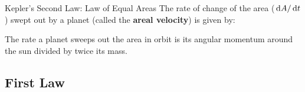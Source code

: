 \documentclass[12pt,compress,aspectratio=169]{beamer}
\begin{document}
%    
%
%      



\begin{frame}{Kepler's Second Law: Law of Equal Areas}
  The rate of change of the area ($\dl A/\dl t$) swept out by a planet (called
  the \textbf{areal velocity}) is given by:


  The rate a planet sweeps out the area in orbit is its angular momentum around
  the sun divided by twice its mass.
\end{frame}



\subsection{First Law}
\end{document}

